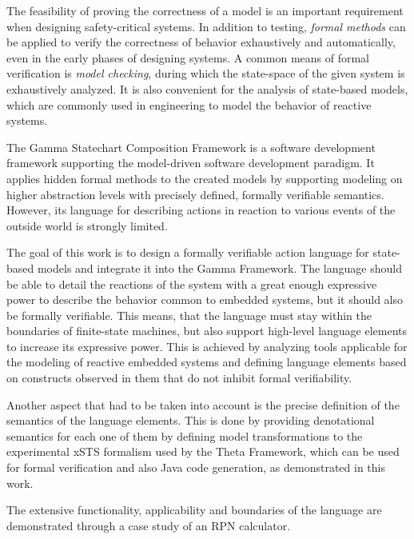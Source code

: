 The feasibility of proving the correctness of a model is an important requirement when designing safety-critical systems. In addition to testing, \textit{formal methods} can be applied to verify the correctness of behavior exhaustively and automatically, even in the early phases of designing systems. A common means of formal verification is \textit{model checking}, during which the state-space of the given system is exhaustively analyzed. It is also convenient for the analysis of state-based models, which are commonly used in engineering to model the behavior of reactive systems.

The Gamma Statechart Composition Framework is a software development framework supporting the model-driven software development paradigm. It applies hidden formal methods to the created models by supporting modeling on higher abstraction levels with precisely defined, formally verifiable semantics. However, its language for describing actions in reaction to various events of the outside world is strongly limited.

The goal of this work is to design a formally verifiable action language for state-based models and integrate it into the Gamma Framework. The language should be able to detail the reactions of the system with a great enough expressive power to describe the behavior common to embedded systems, but it should also be formally verifiable. This means, that the language must stay within the boundaries of finite-state machines, but also support high-level language elements to increase its expressive power. This is achieved by analyzing tools applicable for the modeling of reactive embedded systems and defining language elements based on constructs observed in them that do not inhibit formal verifiability.

Another aspect that had to be taken into account is the precise definition of the semantics of the language elements. This is done by providing denotational semantics for each one of them by defining model transformations to the experimental xSTS formalism used by the Theta Framework, which can be used for formal verification and also Java code generation, as demonstrated in this work.

The extensive functionality, applicability and boundaries of the language are demonstrated through a case study of an RPN calculator.



\vfill
\selectthesislanguage

\setcounter{romanPage}{\value{page}}
